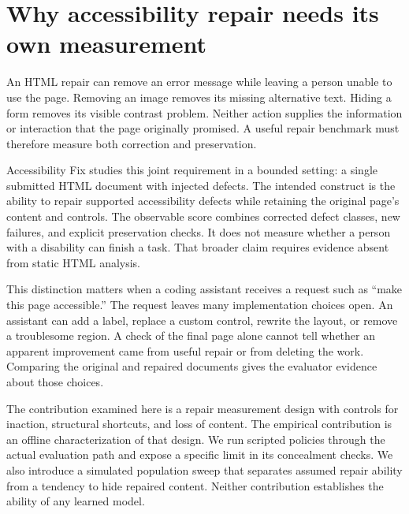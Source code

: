 \documentclass{article}
\title{\PaperTitle}
\author{Pooria Arab\\Independent researcher\\\url{\AuthorOrcid}}
\begin{document}
\maketitle
\begin{abstract}\AbstractText\end{abstract}

\section{Why accessibility repair needs its own measurement}
An HTML repair can remove an error message while leaving a person unable to use the page. Removing an image removes its missing alternative text. Hiding a form removes its visible contrast problem. Neither action supplies the information or interaction that the page originally promised. A useful repair benchmark must therefore measure both correction and preservation.

Accessibility Fix studies this joint requirement in a bounded setting: a single submitted HTML document with injected defects. The intended construct is the ability to repair supported accessibility defects while retaining the original page's content and controls. The observable score combines corrected defect classes, new failures, and explicit preservation checks. It does not measure whether a person with a disability can finish a task. That broader claim requires evidence absent from static HTML analysis.

This distinction matters when a coding assistant receives a request such as ``make this page accessible.'' The request leaves many implementation choices open. An assistant can add a label, replace a custom control, rewrite the layout, or remove a troublesome region. A check of the final page alone cannot tell whether an apparent improvement came from useful repair or from deleting the work. Comparing the original and repaired documents gives the evaluator evidence about those choices.

The contribution examined here is a repair measurement design with controls for inaction, structural shortcuts, and loss of content. The empirical contribution is an offline characterization of that design. We run scripted policies through the actual evaluation path and expose a specific limit in its concealment checks. We also introduce a simulated population sweep that separates assumed repair ability from a tendency to hide repaired content. Neither contribution establishes the ability of any learned model.
\end{document}
